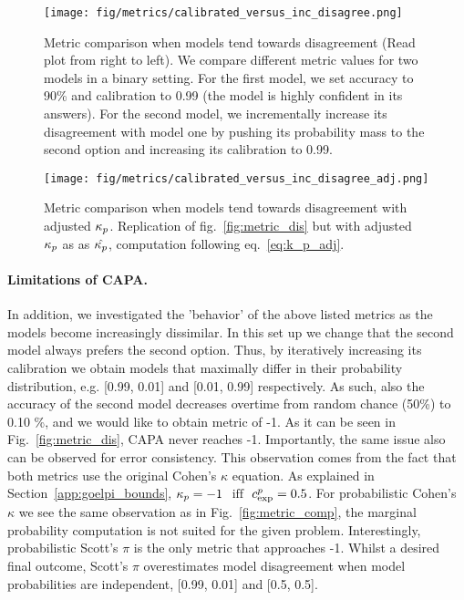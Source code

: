 \begin{figure}[H]
    \centering
    \begin{minipage}[t]{0.48\linewidth}
        \centering
        \vspace{0pt}
        \texttt{[image: fig/metrics/calibrated\_versus\_inc\_disagree.png]}
        \caption{Metric comparison when models tend towards disagreement (Read plot from right to left). We compare different metric values for two models in a binary setting. For the first model, we set accuracy to 90\% and calibration to 0.99 (the model is highly confident in its answers). For the second model, we incrementally increase its disagreement with model one by pushing its probability mass to the second option and increasing its calibration to 0.99.}
        \label{fig:metric_dis}
    \end{minipage}
    \hfill
    \begin{minipage}[t]{0.48\linewidth}
        \centering
        \vspace{0pt}
        \texttt{[image: fig/metrics/calibrated\_versus\_inc\_disagree\_adj.png]}
        \caption{Metric comparison when models tend towards disagreement with adjusted $\kappa_{p}$. Replication of fig.~\ref{fig:metric_dis} but with adjusted $\kappa_{p}$ as  as $\hat{\kappa_{p}}$, computation following eq.~\ref{eq:k_p_adj}.}
        \label{fig:metric_adj}
    \end{minipage}
\end{figure}

\paragraph{Limitations of CAPA.} In addition, we investigated the 'behavior' of the above listed metrics as the models become increasingly dissimilar. In this set up we change that the second model always prefers the second option. Thus, by iteratively increasing its calibration we obtain models that maximally differ in their probability distribution, e.g. [0.99, 0.01] and [0.01, 0.99] respectively. As such, also the accuracy of the second model decreases overtime from random chance (50\%) to 0.10 \%, and we would like to obtain metric of -1. As it can be seen in Fig.~\ref{fig:metric_dis}, CAPA never reaches -1. Importantly, the same issue also can be observed for error consistency. This observation comes from the fact that both metrics use the original Cohen's $\kappa$ equation. As explained in Section~\ref{app:goelpi_bounds}, $\kappa_{p}=-1$ $\text{ iff }$ $c_{\text{exp}}^{p}=0.5$. For probabilistic Cohen's $\kappa$ we see the same observation as in Fig.~\ref{fig:metric_comp}, the marginal probability computation is not suited for the given problem. Interestingly, probabilistic Scott's $\pi$ is the only metric that approaches -1. Whilst a desired final outcome, Scott's $\pi$ overestimates model disagreement when model probabilities are independent, [0.99, 0.01] and [0.5, 0.5]. 

